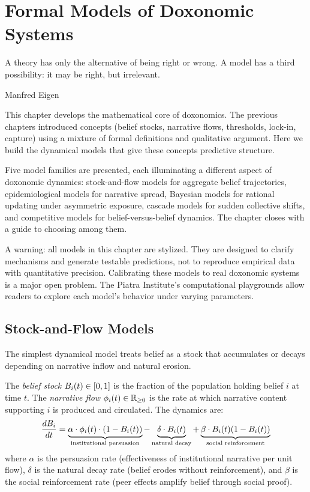 \chapter{Formal Models of Doxonomic Systems}
\label{ch:formal-models}

\epigraph{A theory has only the alternative of being right or wrong. A model has a third possibility: it may be right, but irrelevant.}{Manfred Eigen}

\noindent
This chapter develops the mathematical core of doxonomics.
The previous chapters introduced concepts (belief stocks, narrative flows, thresholds, lock-in, capture) using a mixture of formal definitions and qualitative argument.
Here we build the dynamical models that give these concepts predictive structure.

Five model families are presented, each illuminating a different aspect of doxonomic dynamics: stock-and-flow models for aggregate belief trajectories, epidemiological models for narrative spread, Bayesian models for rational updating under asymmetric exposure, cascade models for sudden collective shifts, and competitive models for belief-versus-belief dynamics.
The chapter closes with a guide to choosing among them.

A warning: all models in this chapter are stylized.
They are designed to clarify mechanisms and generate testable predictions, not to reproduce empirical data with quantitative precision.
Calibrating these models to real doxonomic systems is a major open problem.
The Piatra Institute's computational playgrounds allow readers to explore each model's behavior under varying parameters.


\section{Stock-and-Flow Models}
\label{sec:ch11-stock-flow}

The simplest dynamical model treats belief as a stock that accumulates or decays depending on narrative inflow and natural erosion.

\begin{definition}
\label{def:stock-flow}
The \emph{belief stock} $B_{i}(t) \in [0,1]$ is the fraction of the population holding belief $i$ at time $t$.
The \emph{narrative flow} $\phi_i(t) \in \mathbb{R}_{\geq 0}$ is the rate at which narrative content supporting $i$ is produced and circulated.
The dynamics are:
\begin{equation}
\label{eq:stock-flow}
  \frac{dB_{i}}{dt} = \underbrace{\alpha \cdot \phi_i(t) \cdot (1 - B_{i}(t))}_{\text{institutional persuasion}} - \underbrace{\delta \cdot B_{i}(t)}_{\text{natural decay}} + \underbrace{\beta \cdot B_{i}(t)(1 - B_{i}(t))}_{\text{social reinforcement}}
\end{equation}
where $\alpha$ is the persuasion rate (effectiveness of institutional narrative per unit flow), $\delta$ is the natural decay rate (belief erodes without reinforcement), and $\beta$ is the social reinforcement rate (peer effects amplify belief through social proof).
\end{definition}

